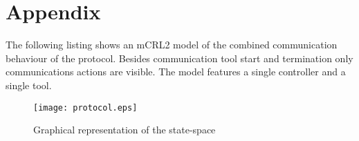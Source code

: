 \documentclass{article}
\begin{document}
  \enlargethispage*{4pt}
  

  \section{Appendix}
  \pagestyle{empty}

  The following listing shows an mCRL2 model of the combined communication
  behaviour of the protocol. Besides communication tool start and termination
  only communications actions are visible. The model features a single
  controller and a single tool.

  \small  \normalsize

  \begin{figure}[H]
   \texttt{[image: protocol.eps]}
   \caption{Graphical representation of the state-space}
  \end{figure}

   
   
\end{document}
